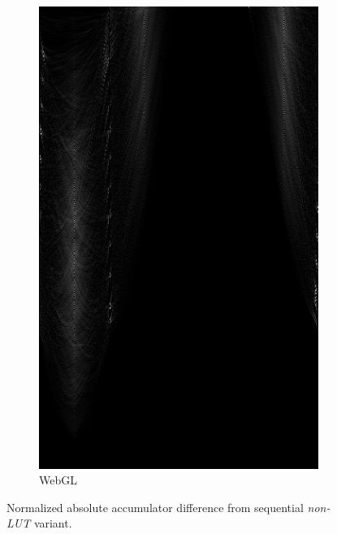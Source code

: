 \begin{figure}
\begin{subfigure}{0.29\textwidth}
        \includegraphics[width=\linewidth] {../../packages/js-benchmarks/img/diff_seq_gpu.png}
        \caption{WebGL}\label{fig:diff:gpu}
    \end{subfigure}
    \caption{Normalized absolute accumulator difference from sequential \textit{non-LUT} variant.}\label{fig:diff}
\end{figure}
